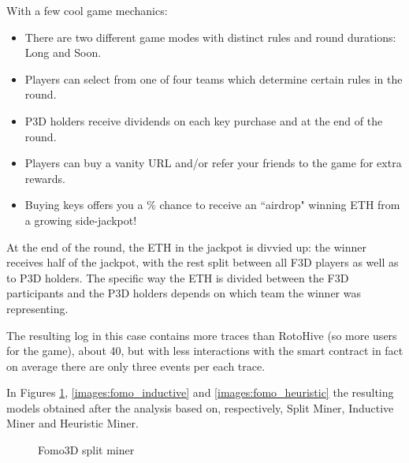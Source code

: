 With a few cool game mechanics:

\begin{itemize}
    \item There are two different game modes with distinct rules and round durations: Long and Soon.
    \item Players can select from one of four teams which determine certain rules in the round.
    \item P3D holders receive dividends on each key purchase and at the end of the round.
    \item Players can buy a vanity URL and/or refer your friends to the game for extra rewards.
    \item Buying keys offers you a \% chance to receive an ``airdrop" winning ETH from a growing side-jackpot!
\end{itemize}

At the end of the round, the ETH in the jackpot is divvied up: the winner receives half of the jackpot, with the rest split 
between all F3D players as well as to P3D holders. The specific way the ETH is divided between the F3D participants 
and the P3D holders depends on which team the winner was representing. 

The resulting log in this case contains more traces than RotoHive (so more users for the game), about 40, but with less 
interactions with the smart contract in fact on average there are only three events per each trace.

In Figures \ref{images:fomo_split}, \ref{images:fomo_inductive} and \ref{images:fomo_heuristic} the resulting models 
obtained after the analysis based on, respectively, Split Miner, Inductive Miner and Heuristic Miner.

\begin{figure}[!ht]
    \centering
    \caption{Fomo3D split miner}
    \label{images:fomo_split}
\end{figure}

